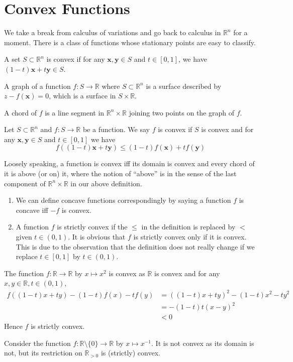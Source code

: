 \documentclass{article}
\begin{document}
\section{Convex Functions}
We take a break from calculus of variations and go back to calculus in $\mathbb R^n$ for a moment.
There is a class of functions whose stationary points are easy to classify.
\begin{definition}
    A set $S\subset\mathbb R^n$ is convex if for any $\mathbf{x},\mathbf{y}\in S$ and $t\in[0,1]$, we have $(1-t)\mathbf{x}+t\mathbf{y}\in S$.
\end{definition}
\begin{definition}
    A graph of a function $f:S\to\mathbb R$ where $S\subset\mathbb R^n$ is a surface described by $z-f(\mathbf{x})=0$, which is a surface in $S\times\mathbb R$.

    A chord of $f$ is a line segment in $\mathbb R^n\times\mathbb R$ joining two points on the graph of $f$.
\end{definition}
\begin{definition}
    Let $S\subset\mathbb R^n$ and $f:S\to\mathbb R$ be a function.
    We say $f$ is convex if $S$ is convex and for any $\mathbf{x},\mathbf{y}\in S$ and $t\in[0,1]$ we have
    $$f((1-t)\mathbf{x}+t\mathbf{y})\le (1-t)f(\mathbf{x})+tf(\mathbf{y})$$
\end{definition}
Loosely speaking, a function is convex iff its domain is convex and every chord of it is above (or on) it, where the notion of ``above'' is in the sense of the last component of $\mathbb R^n\times\mathbb R$ in our above definition.
\newpage

\begin{remark}
    \begin{enumerate}
        \item We can define concave functions correspondingly by saying a function $f$ is concave iff $-f$ is convex.
        \item A function $f$ is strictly convex if the $\le$ in the definition is replaced by $<$ given $t\in (0,1)$.
        It is obvious that $f$ is strictly convex only if it is convex.
        This is due to the observation that the definition does not really change if we replace $t\in[0,1]$ by $t\in(0,1)$.
    \end{enumerate}
\end{remark}
\begin{example}
    The function $f:\mathbb R\to\mathbb R$ by $x\mapsto x^2$ is convex as $\mathbb R$ is convex and for any $x,y\in\mathbb R,t\in (0,1)$,
    \begin{align*}
        f((1-t)x+ty)-(1-t)f(x)-tf(y)&=((1-t)x+ty)^2-(1-t)x^2-ty^2\\
        &=-(1-t)t(x-y)^2\\
        &<0
    \end{align*}
    Hence $f$ is strictly convex.
\end{example}
\begin{example}
    Consider the function $f:\mathbb R\setminus\{0\}\to\mathbb R$ by $x\mapsto x^{-1}$.
    It is not convex as its domain is not, but its restriction on $\mathbb R_{>0}$ is (strictly) convex.
\end{example}
\end{document}
